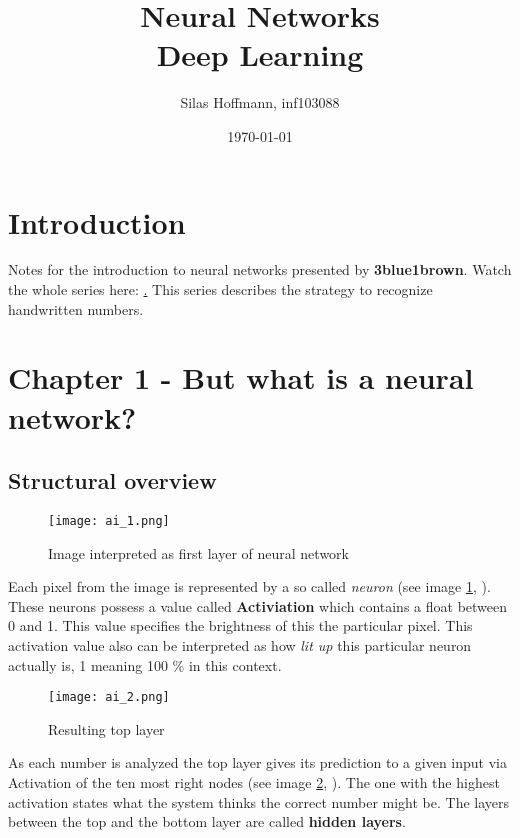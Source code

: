 \documentclass{article}
\title{%
Neural Networks \\
\large Deep Learning}
\author{Silas Hoffmann, inf103088}
\date{\today}
\newcommand{\lbl}[1]{(see image \ref{#1}, \textit{\nameref{#1}})}
\begin{document}
\maketitle

\vspace{0.5cm}
\tableofcontents
\vspace{0.5cm}

\section{Introduction}
Notes for the introduction to neural networks presented by \textbf{3blue1brown}. Watch the whole series here: \href{https://www.youtube.com/watch?v=aircAruvnKk}. This series describes the strategy to recognize handwritten numbers.

\clearpage

\section{Chapter 1 - But what is a neural network?}


\subsection{Structural overview}

\FloatBarrier

\begin{figure}[h]
\centering
\texttt{[image: ai\_1.png]}
\caption{Image interpreted as first layer of neural network}
\label{ai_1}
\end{figure}

Each pixel from the image is represented by a so called \textit{neuron} \lbl{ai_1}. These neurons possess a value called \textbf{Activiation} which contains a float between 0 and 1. This value specifies the brightness of this the particular pixel. This activation value also can be interpreted as how \textit{lit up} this particular neuron actually is, 1 meaning 100 \% in this context.


\begin{figure}[b!]
\centering
\texttt{[image: ai\_2.png]}
\caption{Resulting top layer}
\label{ai_2}
\end{figure}

As each number is analyzed the top layer gives its prediction to a given input via Activation of the ten most right nodes \lbl{ai_2}. The one with the highest activation states what the system thinks the correct number might be. The layers between the top and the bottom layer are called \textbf{hidden layers}. 
\end{document}
